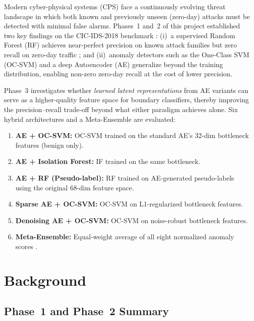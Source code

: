 \documentclass[10pt,conference]{IEEEtran}
\begin{document}
Modern cyber-physical systems (CPS) face a continuously evolving threat
landscape in which both known and previously unseen (zero-day) attacks
must be detected with minimal false alarms.  Phases~1 and~2 of this
project established two key findings on the CIC-IDS-2018 benchmark
\cite{sharafaldin2018}: (i)~a supervised Random Forest (RF) achieves
near-perfect precision on known attack families but zero recall on
zero-day traffic \cite{breiman2001}; and (ii)~anomaly detectors such as
the One-Class SVM (OC-SVM) \cite{scholkopf2001} and a deep Autoencoder
(AE) \cite{goodfellow2016, vincent2010} generalize beyond the training
distribution, enabling non-zero zero-day recall at the cost of lower
precision.

Phase~3 investigates whether \emph{learned latent representations} from
AE variants can serve as a higher-quality feature space for boundary
classifiers, thereby improving the precision--recall trade-off beyond
what either paradigm achieves alone.  Six hybrid architectures and a
Meta-Ensemble are evaluated:

\begin{enumerate}[leftmargin=*,noitemsep,topsep=0pt]
  \item \textbf{AE + OC-SVM:} OC-SVM trained on the standard AE's
        32-dim bottleneck features (benign only).
  \item \textbf{AE + Isolation Forest:} IF \cite{liu2008} trained on the
        same bottleneck.
  \item \textbf{AE + RF (Pseudo-label):} RF trained on AE-generated
        pseudo-labels using the original 68-dim feature space.
  \item \textbf{Sparse AE + OC-SVM:} OC-SVM on L1-regularized
        bottleneck features.
  \item \textbf{Denoising AE + OC-SVM:} OC-SVM on noise-robust
        bottleneck features.
  \item \textbf{Meta-Ensemble:} Equal-weight average of all eight
        normalized anomaly scores \cite{dietterich2000}.
\end{enumerate}

\section{Background}
\label{sec:background}

\subsection{Phase~1 and Phase~2 Summary}
\end{document}
